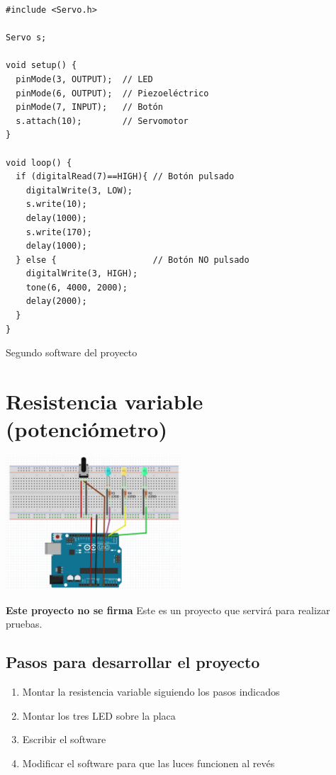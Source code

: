 \documentclass[11pt,spanish,a4paper]{article}
\begin{document}
\begin{listing}[H]
\begin{verbatim}
#include <Servo.h>

Servo s;

void setup() {
  pinMode(3, OUTPUT);  // LED
  pinMode(6, OUTPUT);  // Piezoeléctrico
  pinMode(7, INPUT);   // Botón
  s.attach(10);        // Servomotor
}

void loop() {
  if (digitalRead(7)==HIGH){ // Botón pulsado
    digitalWrite(3, LOW);
    s.write(10);
    delay(1000);
    s.write(170);
    delay(1000);
  } else {                   // Botón NO pulsado
	digitalWrite(3, HIGH);
	tone(6, 4000, 2000);
	delay(2000);
  }
}
\end{verbatim}
	\caption{Segundo software del proyecto \thesection}
\end{listing}

\newpage
\section{Resistencia variable (potenciómetro)}

\begin{center}
\includegraphics[height=5cm]{img/08.jpg}
\end{center}

\textbf{Este proyecto no se firma} Este es un proyecto que servirá para realizar pruebas.

\subsection{Pasos para desarrollar el proyecto}
\begin{enumerate}
	\item Montar la resistencia variable siguiendo los pasos indicados
	\item Montar los tres LED sobre la placa
	\item Escribir el software
	\item Modificar el software para que las luces funcionen al revés
\end{enumerate}
\end{document}

